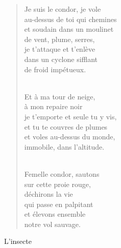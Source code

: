 \documentclass[11pt,a4paper]{book}
\begin{document}
\begin{verse}
Je suis le condor, je vole \\
au-dessus de toi qui chemines \\
et soudain dans un moulinet \\
de vent, plume, serres, \\
je t'attaque et t'enlève \\
dans un cyclone sifflant \\
de froid impétueux. \\ \

Et à ma tour de neige, \\
à mon repaire noir \\
je t'emporte et seule tu y vis, \\
et tu te couvres de plumes \\
et voles au-dessus du monde, \\
immobile, dans l'altitude. \\ \

Femelle condor, sautons \\
sur cette proie rouge, \\
déchirons la vie \\
qui passe en palpitant \\
et élevons ensemble \\
notre vol sauvage.
\end{verse}

\newpage

{\huge L'insecte} \\ \\
\end{document}
